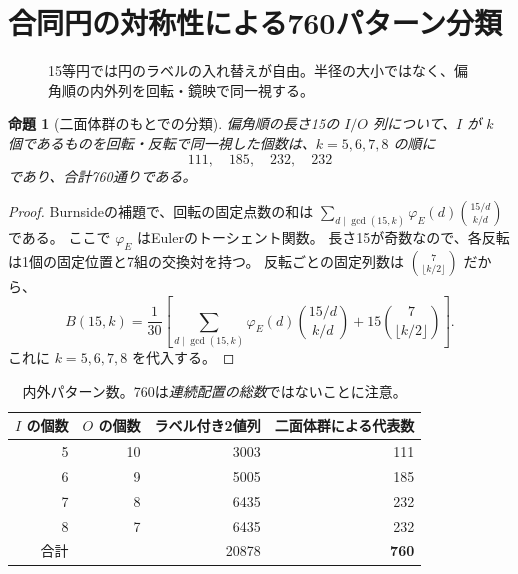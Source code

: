 \documentclass[11pt,a4paper]{article}
\theoremstyle{JPthm}
\newtheorem{proposition}[theorem]{命題}
\theoremstyle{definition}
\begin{document}
\section{合同円の対称性による760パターン分類}
\begin{figure}[H]
\centering
{}
\caption{15等円では円のラベルの入れ替えが自由。半径の大小ではなく、偏角順の内外列を回転・鏡映で同一視する。}
\label{fig:patterns}
\end{figure}
\begin{proposition}[二面体群のもとでの分類]\label{prop:necklaces}
偏角順の長さ15の $I/O$ 列について、$I$ が $k$ 個であるものを回転・反転で同一視した個数は、$k=5,6,7,8$ の順に
\[
 \boxed{111,\quad185,\quad232,\quad232}
\]
であり、合計760通りである。
\end{proposition}
\begin{proof}
Burnsideの補題で、回転の固定点数の和は
$\sum_{d\mid\gcd(15,k)}\varphi_{\!E}(d)\binom{15/d}{k/d}$ である。
ここで $\varphi_{\!E}$ はEulerのトーシェント関数。
長さ15が奇数なので、各反転は1個の固定位置と7組の交換対を持つ。
反転ごとの固定列数は $\binom7{\lfloor k/2\rfloor}$ だから、
\[
 B(15,k)=\frac1{30}\left[
 \sum_{d\mid\gcd(15,k)}\varphi_{\!E}(d)\binom{15/d}{k/d}
 +15\binom7{\lfloor k/2\rfloor}\right].
\]
これに $k=5,6,7,8$ を代入する。
\end{proof}
\begin{table}[H]\centering
\caption{内外パターン数。760は\emph{連続配置の総数}ではないことに注意。}
\begin{tabular}{rrrr}
\toprule
$I$ の個数 & $O$ の個数 & ラベル付き2値列 & 二面体群による代表数\\
\midrule
5&10&3003&111\\
6&9&5005&185\\
7&8&6435&232\\
8&7&6435&232\\
\midrule
合計& &20878&\textbf{760}\\
\bottomrule
\end{tabular}
\end{table}
\end{document}
